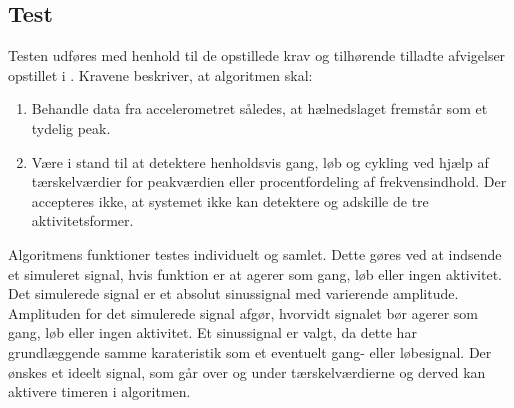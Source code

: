 \subsection{Test}
Testen udføres med henhold til de opstillede krav og tilhørende tilladte afvigelser opstillet i . Kravene beskriver, at algoritmen skal:
\begin{enumerate}
	\item Behandle data fra accelerometret således, at hælnedslaget fremstår som et tydelig peak.
	\item Være i stand til at detektere henholdsvis gang, løb og cykling ved hjælp af tærskelværdier for peakværdien eller procentfordeling af frekvensindhold. Der accepteres ikke, at systemet ikke kan detektere og adskille de tre aktivitetsformer.
\end{enumerate}
Algoritmens funktioner testes individuelt og samlet. Dette gøres ved at indsende et simuleret signal, hvis funktion er at agerer som gang, løb eller ingen aktivitet. Det simulerede signal er et absolut sinussignal med varierende amplitude. Amplituden for det simulerede signal afgør, hvorvidt signalet bør agerer som gang, løb eller ingen aktivitet. Et sinussignal er valgt, da dette har grundlæggende samme karateristik som et eventuelt gang- eller løbesignal. Der ønskes et ideelt signal, som går over og under tærskelværdierne og derved kan aktivere timeren i algoritmen.

